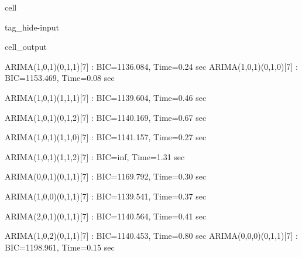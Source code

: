 \documentclass[letterpaper,10pt,english]{jupyterBook}
\begin{document}
\begin{sphinxuseclass}{cell}
\begin{sphinxuseclass}{tag_hide-input}
\begin{sphinxuseclass}{cell_output}
\begin{sphinxVerbatim}[commandchars=\\\{\}]
 ARIMA(1,0,1)(0,1,1)[7]             : BIC=1136.084, Time=0.24 sec
 ARIMA(1,0,1)(0,1,0)[7]             : BIC=1153.469, Time=0.08 sec
\end{sphinxVerbatim}

\begin{sphinxVerbatim}[commandchars=\\\{\}]
 ARIMA(1,0,1)(1,1,1)[7]             : BIC=1139.604, Time=0.46 sec
\end{sphinxVerbatim}

\begin{sphinxVerbatim}[commandchars=\\\{\}]
 ARIMA(1,0,1)(0,1,2)[7]             : BIC=1140.169, Time=0.67 sec
\end{sphinxVerbatim}

\begin{sphinxVerbatim}[commandchars=\\\{\}]
 ARIMA(1,0,1)(1,1,0)[7]             : BIC=1141.157, Time=0.27 sec
\end{sphinxVerbatim}

\begin{sphinxVerbatim}[commandchars=\\\{\}]
 ARIMA(1,0,1)(1,1,2)[7]             : BIC=inf, Time=1.31 sec
\end{sphinxVerbatim}

\begin{sphinxVerbatim}[commandchars=\\\{\}]
 ARIMA(0,0,1)(0,1,1)[7]             : BIC=1169.792, Time=0.30 sec
\end{sphinxVerbatim}

\begin{sphinxVerbatim}[commandchars=\\\{\}]
 ARIMA(1,0,0)(0,1,1)[7]             : BIC=1139.541, Time=0.37 sec
\end{sphinxVerbatim}

\begin{sphinxVerbatim}[commandchars=\\\{\}]
 ARIMA(2,0,1)(0,1,1)[7]             : BIC=1140.564, Time=0.41 sec
\end{sphinxVerbatim}

\begin{sphinxVerbatim}[commandchars=\\\{\}]
 ARIMA(1,0,2)(0,1,1)[7]             : BIC=1140.453, Time=0.80 sec
 ARIMA(0,0,0)(0,1,1)[7]             : BIC=1198.961, Time=0.15 sec
\end{sphinxVerbatim}


\end{sphinxuseclass}
\end{sphinxuseclass}
\end{sphinxuseclass}
\end{document}
